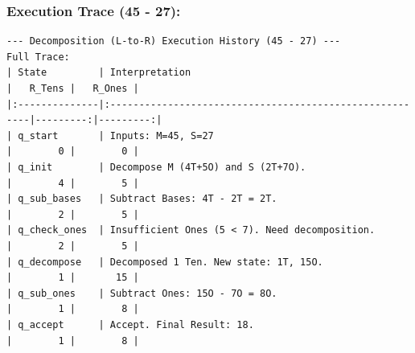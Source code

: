 \documentclass[11pt]{article}
\begin{document}
\subsubsection*{Execution Trace (45 - 27):}
\begin{verbatim}
--- Decomposition (L-to-R) Execution History (45 - 27) ---
Full Trace:
| State         | Interpretation                                          |   R_Tens |   R_Ones |
|:--------------|:--------------------------------------------------------|---------:|---------:|
| q_start       | Inputs: M=45, S=27                                      |        0 |        0 |
| q_init        | Decompose M (4T+5O) and S (2T+7O).                      |        4 |        5 |
| q_sub_bases   | Subtract Bases: 4T - 2T = 2T.                           |        2 |        5 |
| q_check_ones  | Insufficient Ones (5 < 7). Need decomposition.          |        2 |        5 |
| q_decompose   | Decomposed 1 Ten. New state: 1T, 15O.                   |        1 |       15 |
| q_sub_ones    | Subtract Ones: 15O - 7O = 8O.                           |        1 |        8 |
| q_accept      | Accept. Final Result: 18.                               |        1 |        8 |
\end{verbatim}

\printbibliography
\end{document}
